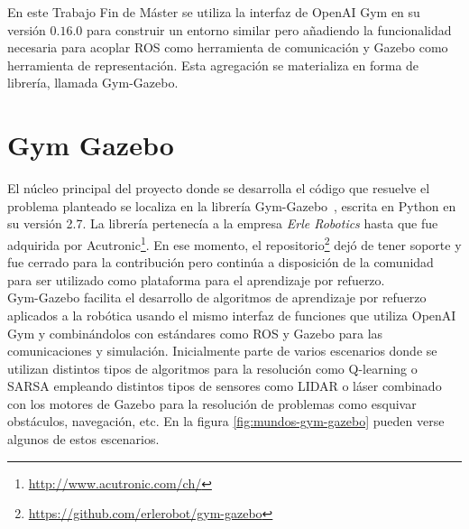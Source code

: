 En este Trabajo Fin de Máster se utiliza la interfaz de OpenAI Gym en su versión $0.16.0$ para construir un entorno similar pero añadiendo la funcionalidad necesaria para acoplar ROS como herramienta de comunicación y Gazebo como herramienta de representación. Esta agregación se materializa en forma de librería, llamada Gym-Gazebo.


\section{Gym Gazebo}

El núcleo principal del proyecto donde se desarrolla el código que resuelve el problema planteado se localiza en la librería Gym-Gazebo~\cite{paper_gym_gazebo}, escrita en Python en su versión 2.7. La librería pertenecía a la empresa \textit{Erle Robotics} hasta que fue adquirida por Acutronic\footnote{\url{http://www.acutronic.com/ch/}}. En ese momento, el repositorio\footnote{\url{https://github.com/erlerobot/gym-gazebo}} dejó de tener soporte y fue cerrado para la contribución pero continúa a disposición de la comunidad para ser utilizado como plataforma para el aprendizaje por refuerzo.\\

Gym-Gazebo facilita el desarrollo de algoritmos de aprendizaje por refuerzo aplicados a la robótica usando el mismo interfaz de funciones que utiliza OpenAI Gym y combinándolos con estándares como ROS y Gazebo para las comunicaciones y simulación. Inicialmente parte de varios escenarios donde se utilizan distintos tipos de algoritmos para la resolución como Q-learning o SARSA empleando distintos tipos de sensores como LIDAR o láser combinado con los motores de Gazebo para la resolución de problemas como esquivar obstáculos, navegación, etc. En la figura \ref{fig:mundos-gym-gazebo} pueden verse algunos de estos escenarios.


